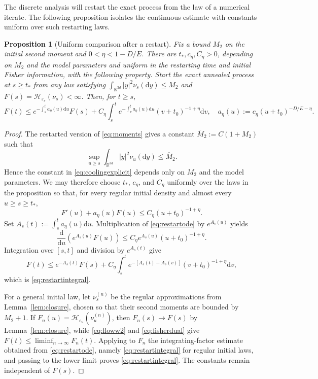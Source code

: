 \documentclass[11pt]{article}
\newtheorem{proposition}[theorem]{Proposition}
\theoremstyle{definition}
\newcommand{\R}{\mathbb R}
\newcommand{\dd}{\mathrm d}
\newcommand{\cH}{\mathcal H}
\newcommand{\eps}{\varepsilon}
\begin{document}
The discrete analysis will restart the exact process from the law of a numerical
iterate. The following proposition isolates the continuous estimate with constants
uniform over such restarting laws.

\begin{proposition}[Uniform comparison after a restart]\label{prop:restart}
Fix a bound $M_2$ on the initial second moment and
$0<\eta<1-D/E$. There are $t_*,c_\eta,C_\eta>0$, depending on $M_2$
and the model parameters and uniform in the restarting time and initial
Fisher information, with the following property. Start the exact annealed
process at $s\geq t_*$ from any law satisfying
$\int_{\R^{3d}}|y|^2\nu_s(\dd y)\leq M_2$ and
$F(s)=\cH_{\eps_s}(\nu_s)<\infty$. Then, for
$t\geq s$,
\begin{equation}\label{eq:restartintegral}
 F(t)\leq e^{-\int_s^t a_\eta(u)\dd u}F(s)
 +C_\eta\int_s^t e^{-\int_v^t a_\eta(u)\dd u}
                         (v+t_0)^{-1+\eta}\dd v,
 \quad a_\eta(u):=c_\eta(u+t_0)^{-D/E-\eta}.
\end{equation}
\end{proposition}
\begin{proof}
The restarted version of \eqref{eq:moments} gives a constant
$\overline M_2:=C(1+M_2)$ such that
\[
 \sup_{u\geq s}\int_{\R^{3d}}|y|^2\nu_u(\dd y)\leq\overline M_2.
\]
Hence the constant in \eqref{eq:coolingexplicit} depends only on $M_2$ and
the model parameters. We may therefore choose $t_*$, $c_\eta$, and $C_\eta$
uniformly over the laws in the proposition so that, for every regular initial
density and almost every $u\geq s\geq t_*$,
\begin{equation}\label{eq:restartode}
 F'(u)+a_\eta(u)F(u)
 \leq C_\eta(u+t_0)^{-1+\eta}.
\end{equation}
Set $A_s(t):=\int_s^t a_\eta(u)\dd u$. Multiplication of
\eqref{eq:restartode} by $e^{A_s(u)}$ yields
\[
 \frac{\dd}{\dd u}\left(e^{A_s(u)}F(u)\right)
 \leq C_\eta e^{A_s(u)}(u+t_0)^{-1+\eta}.
\]
Integration over $[s,t]$ and division by $e^{A_s(t)}$ give
\[
 F(t)\leq e^{-A_s(t)}F(s)
 +C_\eta\int_s^t e^{-[A_s(t)-A_s(v)]}
                   (v+t_0)^{-1+\eta}\dd v,
\]
which is \eqref{eq:restartintegral}.

For a general initial law, let $\nu_s^{(n)}$ be the regular approximations
from Lemma~\ref{lem:closure}, chosen so that their second moments are bounded
by $M_2+1$. If
$F_n(u)=\cH_{\eps_u}\left(\nu_u^{(n)}\right)$, then
$F_n(s)\to F(s)$ by Lemma~\ref{lem:closure}, while
\eqref{eq:floww2} and \eqref{eq:fisherdual} give
$F(t)\leq\liminf_{n\to\infty}F_n(t)$. Applying to $F_n$ the
integrating-factor estimate obtained from \eqref{eq:restartode}, namely
\eqref{eq:restartintegral} for regular initial laws,
and passing to the lower limit proves \eqref{eq:restartintegral}. The
constants remain independent of $F(s)$.
\end{proof}
\end{document}
